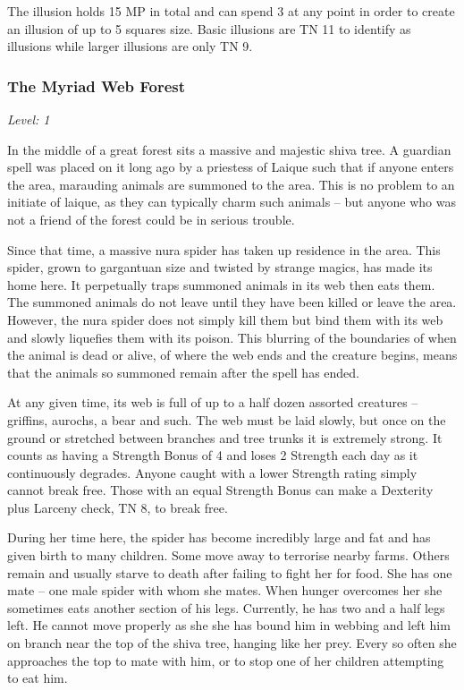 The illusion holds 15 MP in total and can spend 3 at any point in order to create an illusion of up to 5 squares size.  Basic illusions are TN 11 to identify as illusions while larger illusions are only TN 9.

\subsubsection{The Myriad Web Forest}

\textit{Level: 1}

In the middle of a great forest sits a massive and majestic shiva tree.  A guardian spell was placed on it long ago by a priestess of Laique such that if anyone enters the area, marauding animals are summoned to the area. This is no problem to an initiate of laique, as they can typically charm such animals -- but anyone who was not a friend of the forest could be in serious trouble.

Since that time, a massive nura spider has taken up residence in the area.  This spider, grown to gargantuan size and twisted by strange magics, has made its home here.  It perpetually traps summoned animals in its web then eats them.  The summoned animals do not leave until they have been killed or leave the area.  However, the nura spider does not simply kill them but bind them with its web and slowly liquefies them with its poison.  This blurring of the boundaries of when the animal is dead or alive, of where the web ends and the creature begins, means that the animals so summoned remain after the spell has ended.

At any given time, its web is full of up to a half dozen assorted creatures -- griffins, aurochs, a bear and such.  The web must be laid slowly, but once on the ground or stretched between branches and tree trunks it is extremely strong.  It counts as having a Strength Bonus of 4 and loses 2 Strength each day as it continuously degrades.  Anyone caught with a lower Strength rating simply cannot break free.  Those with an equal Strength Bonus can make a Dexterity plus Larceny check, TN 8, to break free.

During her time here, the spider has become incredibly large and fat and has given birth to many children.  Some move away to terrorise nearby farms.  Others remain and usually starve to death after failing to fight her for food.  She has one mate -- one male spider with whom she mates.  When hunger overcomes her she sometimes eats another section of his legs.  Currently, he has two and a half legs left.  He cannot move properly as she she has bound him in webbing and left him on branch near the top of the shiva tree, hanging like her prey.  Every so often she approaches the top to mate with him, or to stop one of her children attempting to eat him.

